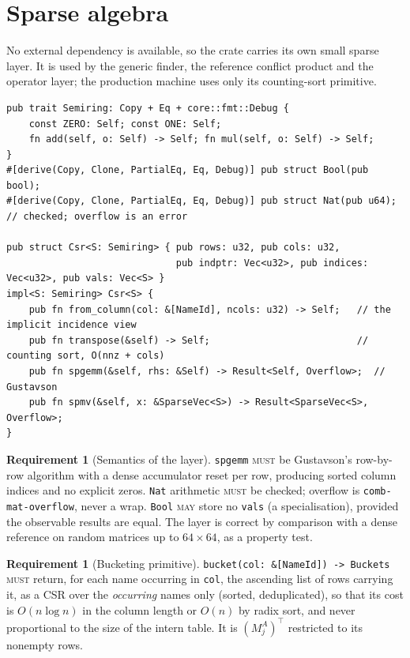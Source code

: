 \documentclass[11pt,a4paper]{article}
\newcommand{\code}[1]{\texttt{#1}}
\newcommand{\MUST}{\textsc{must}}
\newcommand{\MAY}{\textsc{may}}
\theoremstyle{definition}
\newtheorem{requirement}[definition]{Requirement}
\theoremstyle{plain}
\begin{document}
\section{Sparse algebra}\label{sec:sparse}

No external dependency is available, so the crate carries its own small
sparse layer. It is used by the generic finder, the reference conflict
product and the operator layer; the production machine uses only its
counting-sort primitive.

\begin{lstlisting}
pub trait Semiring: Copy + Eq + core::fmt::Debug {
    const ZERO: Self; const ONE: Self;
    fn add(self, o: Self) -> Self; fn mul(self, o: Self) -> Self;
}
#[derive(Copy, Clone, PartialEq, Eq, Debug)] pub struct Bool(pub bool);
#[derive(Copy, Clone, PartialEq, Eq, Debug)] pub struct Nat(pub u64);   // checked; overflow is an error

pub struct Csr<S: Semiring> { pub rows: u32, pub cols: u32,
                              pub indptr: Vec<u32>, pub indices: Vec<u32>, pub vals: Vec<S> }
impl<S: Semiring> Csr<S> {
    pub fn from_column(col: &[NameId], ncols: u32) -> Self;   // the implicit incidence view
    pub fn transpose(&self) -> Self;                          // counting sort, O(nnz + cols)
    pub fn spgemm(&self, rhs: &Self) -> Result<Self, Overflow>;  // Gustavson
    pub fn spmv(&self, x: &SparseVec<S>) -> Result<SparseVec<S>, Overflow>;
}
\end{lstlisting}

\begin{requirement}[Semantics of the layer]\label{req:sparse}
\code{spgemm} \MUST{} be Gustavson's row-by-row algorithm \cite{gustavson}
with a dense accumulator reset per row, producing sorted column indices and
no explicit zeros. \code{Nat} arithmetic \MUST{} be checked; overflow is
\code{comb-mat-overflow}, never a wrap. \code{Bool} \MAY{} store no
\code{vals} (a specialisation), provided the observable results are equal.
The layer is correct by comparison with a dense reference on random matrices
up to $64 \times 64$, as a property test.
\end{requirement}

\begin{requirement}[Bucketing primitive]\label{req:bucket}
\code{bucket(col: \&[NameId]) -> Buckets} \MUST{} return, for each name
occurring in \code{col}, the ascending list of rows carrying it, as a CSR
over the \emph{occurring} names only (sorted, deduplicated), so that its cost
is $O(n \log n)$ in the column length or $O(n)$ by radix sort, and never
proportional to the size of the intern table. It is $(M^{A}_{j})^{\top}$
restricted to its nonempty rows.
\end{requirement}
\end{document}
